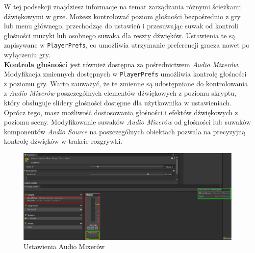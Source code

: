 W tej podsekcji znajdziesz informacje na temat zarządzania różnymi ścieżkami dźwiękowymi w grze. Możesz kontrolować poziom głośności bezpośrednio z gry lub menu głównego, przechodząc do ustawień i przesuwając suwak od kontroli głośności muzyki lub osobnego suwaka dla reszty dźwięków. Ustawienia te są zapisywane w \texttt{PlayerPrefs}, co umożliwia utrzymanie preferencji gracza nawet po wyłączeniu gry. \\

\textbf{Kontrola głośności} jest również dostępna za pośrednictwem \textit{Audio Mixerów}. Modyfikacja zmiennych dostępnych w \texttt{PlayerPrefs} umożliwia kontrolę głośności z poziomu gry. Warto zauważyć, że te zmienne są udostępniane do kontrolowania z \textit{Audio Mixerów} poszczególnych elementów dźwiękowych z poziomu skryptu, który obsługuje slidery głośności dostępne dla użytkownika w ustawieniach. \\

Oprócz tego, masz możliwość dostosowania głośności i efektów dźwiękowych z poziomu sceny. Modyfikowanie suwaków \textit{Audio Mixerów} od głośności lub suwaków komponentów \textit{Audio Source} na poszczególnych obiektach pozwala na precyzyjną kontrolę dźwięków w trakcie rozgrywki.

\begin{figure}[h]
    \centering
    \includegraphics[width=1\linewidth]{Images/audioMixersSet.png}
    \caption{Ustawienia Audio Mixerów}
\end{figure}